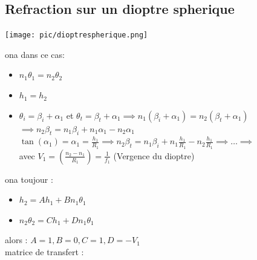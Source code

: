 \documentclass[12pt]{book}
\begin{document}
        \subsection{Refraction sur un dioptre spherique}
            \begin{center}
                \texttt{[image: pic/dioptrespherique.png]}
            \end{center}
            ona dans ce cas:
            \begin{itemize}
                \item $n_1\theta_1 = n_2\theta_2$
                \item $h_1 = h_2$
                \item $\theta_i =\beta_i + \alpha_1$ et $\theta_t =\beta_t + \alpha_1 \implies n_1(\beta_i + \alpha_1) = n_2(\beta_t + \alpha_1)  $ \\ 
                      $\implies n_2\beta_t = n_1\beta_i +n_1\alpha_1 - n_2\alpha_1$ \\
                      $\tan(\alpha_1) = \alpha_1 = \frac{h_1}{R_1} \implies n_2\beta_t = n_1\beta_i +n_1\frac{h_1}{R_1} - n_2\frac{h_1}{R_1} \implies \ldots \implies $ \\
                       avec $V_1 = (\frac{n_2-n_1}{R_1}) = \frac{1}{f_1}$ (Vergence du dioptre)
            \end{itemize}
            \pagebreak
            ona toujour :
            \begin{itemize}
                \item $ h_2 = Ah_1 + Bn_1\theta_1$
                \item $ n_2\theta_2 = Ch_1 + Dn_1\theta_1$
            \end{itemize}
            alors : $ A = 1 , B = 0 ,C = 1 , D = -V_1$ \\ 
            matrice de transfert : 
            \begin{center}
                 \\
            \end{center}
        
\end{document}
